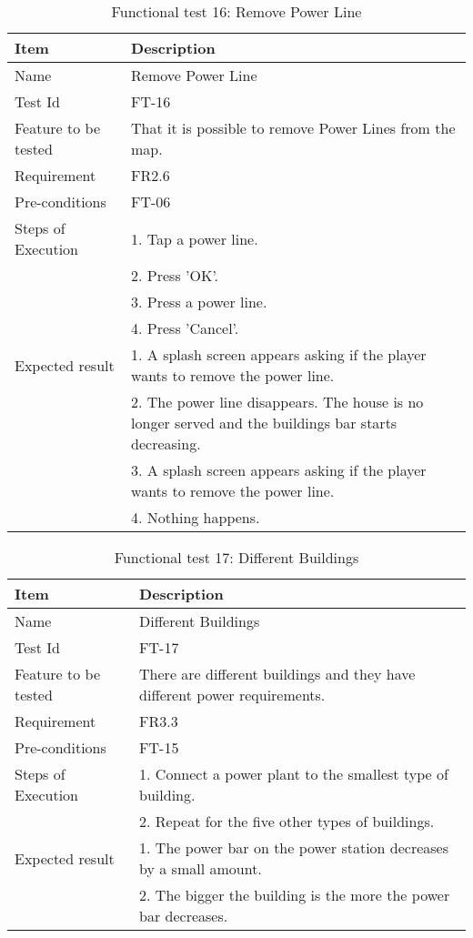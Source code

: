 \begin{table}[H]
\centering
	\begin{tabular}{ l | p{8cm} }
		\hline
		\rowcolor{lightgray}
		{\bf Item} & {\bf Description} \\ \hline
		Name & Remove Power Line \\ 
		Test Id & FT-16 \\ 
		Feature to be tested & That it is possible to remove Power Lines from the map. \\ 
		Requirement & FR2.6 \\ 
		Pre-conditions & FT-06 \\ 
		Steps of Execution & 1. Tap a power line.  \\ 
		& 2. Press 'OK'. \\
		& 3. Press a power line. \\
		& 4. Press 'Cancel'. \\
		Expected result & 1. A splash screen appears asking if the player wants to remove the power line. \\ 
		& 2. The power line disappears. The house is no longer served and the buildings bar starts decreasing. \\
		& 3. A splash screen appears asking if the player wants to remove the power line. \\
		& 4. Nothing happens. \\
		\hline
	\end{tabular}
	\caption{Functional test 16: Remove Power Line}
\end{table}



\begin{table}[H]
\centering
	\begin{tabular}{ l | p{8cm} }
		\hline
		\rowcolor{lightgray}
		{\bf Item} & {\bf Description} \\ \hline
		Name & Different Buildings \\ 
		Test Id & FT-17 \\ 
		Feature to be tested & There are different buildings and they have different power requirements. \\ 
		Requirement & FR3.3 \\ 
		Pre-conditions & FT-15 \\ 
		Steps of Execution & 1. Connect a power plant to the smallest type of building. \\
		& 2. Repeat for the five other types of buildings. \\
		Expected result & 1. The power bar on the power station decreases by a small amount. \\
		& 2. The bigger the building is the more the power bar decreases. \\
		\hline
	\end{tabular}
	\caption{Functional test 17: Different Buildings}
\end{table}

